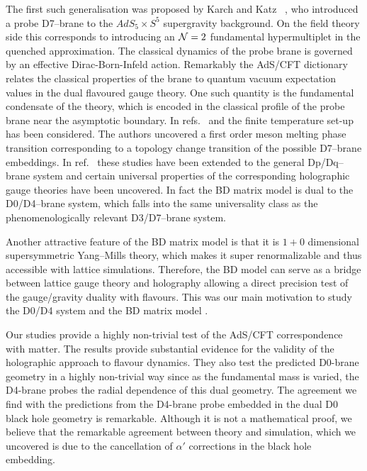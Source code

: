 \documentclass[a4paper]{jpconf}
\begin{document}
The first such generalisation was proposed by Karch and
Katz~\cite{Karch:2002sh} , who introduced a probe D7--brane to the
$AdS_5\times S^5$ supergravity background. On the field theory side
this corresponds to introducing an ${\cal N}=2$ fundamental
hypermultiplet in the quenched approximation. The classical dynamics
of the probe brane is governed by an effective Dirac-Born-Infeld
action. Remarkably the AdS/CFT dictionary relates the classical
properties of the brane to quantum vacuum expectation values in the
dual flavoured gauge theory. One such quantity is the fundamental
condensate of the theory, which is encoded in the classical profile of
the probe brane near the asymptotic boundary. In
refs.~\cite{Babington:2003vm} and \cite{Hoyos:2006gb} the finite
temperature set-up has been considered. The authors uncovered a first
order meson melting phase transition corresponding to a topology
change transition of the possible D7--brane embeddings. In ref.~\cite{Mateos:2007vn} 
these studies have been extended to the general
Dp/Dq--brane system and certain universal properties of the
corresponding holographic gauge theories have been uncovered. In fact the BD matrix model is dual to
the D0/D4--brane system, which falls into the same universality class as the phenomenologically relevant D3/D7--brane
system.

Another attractive feature of the BD matrix model is that it is $1+0$
dimensional supersymmetric Yang--Mills theory, which makes it super
renormalizable and thus accessible with lattice
simulations. Therefore, the BD model can serve as a bridge between
lattice gauge theory and holography allowing a direct precision test
of the gauge/gravity duality with flavours. This was our main
motivation to study the D0/D4 system and the BD matrix model
\cite{Filev:2015cmz}.

Our studies provide a highly non-trivial test of the AdS/CFT
correspondence with matter.  The results provide substantial evidence
for the validity of the holographic approach to flavour dynamics.
They also test the predicted D0-brane geometry in a highly
non-trivial way since as the fundamental mass is varied, the D4-brane
probes the radial dependence of this dual geometry. The agreement
we find with the predictions from the D4-brane probe embedded in the
dual D0 black hole geometry is remarkable. Although it is not a
mathematical proof, we believe that the remarkable agreement between
theory and simulation, which we uncovered is due to the cancellation of
$\alpha'$ corrections in the black hole embedding.
\end{document}
